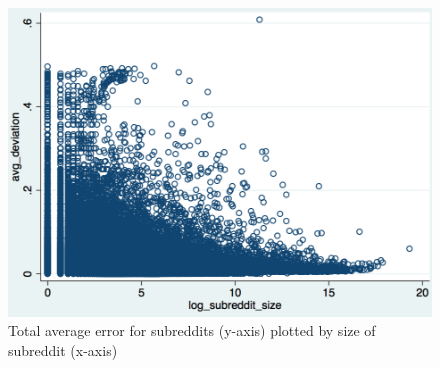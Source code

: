 \documentclass[letterpaper,12pt]{article}
\begin{document}
\begin{figure}[h]
  \centering
  \includegraphics[width=\textwidth]{tae}
  \caption{Total average error for subreddits (y-axis) plotted by size of subreddit (x-axis)}
  \label{fig:tae}
\end{figure}
\clearpage
\end{document}
